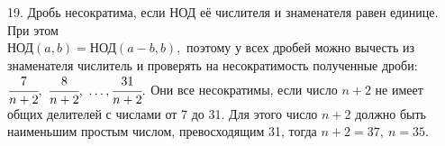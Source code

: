 19. Дробь несократима, если НОД её числителя и знаменателя равен единице. При этом\\ НОД$(a,b)=$НОД$(a-b,b),$ поэтому у всех дробей можно вычесть из знаменателя числитель и проверять на несократимость полученные дроби: $\cfrac{7}{n+2},\ \cfrac{8}{n+2},\ \ldots, \cfrac{31}{n+2}.$ Они все несократимы, если число $n+2$ не имеет общих делителей с числами от 7 до 31. Для этого число $n+2$ должно быть наименьшим простым числом, превосходящим 31, тогда $n+2=37,\ n=35.$\\

